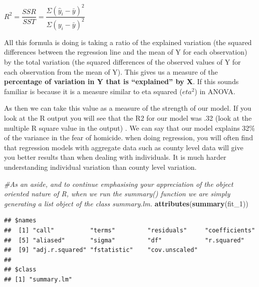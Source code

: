 \documentclass[]{book}
\newenvironment{Shaded}{\begin{snugshade}}{\end{snugshade}}
\newcommand{\CommentTok}[1]{\textcolor[rgb]{0.56,0.35,0.01}{\textit{#1}}}
\newcommand{\DecValTok}[1]{\textcolor[rgb]{0.00,0.00,0.81}{#1}}
\newcommand{\KeywordTok}[1]{\textcolor[rgb]{0.13,0.29,0.53}{\textbf{#1}}}
\newcommand{\NormalTok}[1]{#1}
\newcommand{\OperatorTok}[1]{\textcolor[rgb]{0.81,0.36,0.00}{\textbf{#1}}}
\begin{document}
\(R^2 = \dfrac{SSR}{SST} = \dfrac{\Sigma(\hat y_i - \bar y )^2}{\Sigma(y_i - \bar y )^2}\)

All this formula is doing is taking a ratio of the explained variation (the squared differences between the regression line and the mean of Y for each observation) by the total variation (the squared differences of the observed values of Y for each observation from the mean of Y). This gives us a measure of the \textbf{percentage of variation in Y that is ``explained'' by X}. If this sounds familiar is because it is a measure similar to eta squared (\(eta^2\)) in ANOVA.

As then we can take this value as a measure of the strength of our model. If you look at the R output you will see that the R2 for our model was .32 (look at the multiple R square value in the output) . We can say that our model explains 32\% of the variance in the fear of homicide. when doing regression, you will often find that regression models with aggregate data such as county level data will give you better results than when dealing with individuals. It is much harder understanding individual variation than county level variation.

\begin{Shaded}
\begin{Highlighting}[]
\CommentTok{#As an aside, and to continue emphasising your appreciation of the object oriented nature of R, when we run the summary() function we are simply generating a list object of the class summary.lm.}
\KeywordTok{attributes}\NormalTok{(}\KeywordTok{summary}\NormalTok{(fit_}\DecValTok{1}\NormalTok{))}
\end{Highlighting}
\end{Shaded}

\begin{verbatim}
## $names
##  [1] "call"          "terms"         "residuals"     "coefficients" 
##  [5] "aliased"       "sigma"         "df"            "r.squared"    
##  [9] "adj.r.squared" "fstatistic"    "cov.unscaled" 
## 
## $class
## [1] "summary.lm"
\end{verbatim}

\begin{Shaded}
\end{Shaded}
\end{document}
